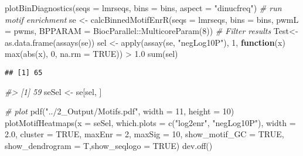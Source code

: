 \documentclass[
  10pt,
]{article}
\newenvironment{Shaded}{\begin{snugshade}}{\end{snugshade}}
\newcommand{\AttributeTok}[1]{\textcolor[rgb]{0.77,0.63,0.00}{#1}}
\newcommand{\CommentTok}[1]{\textcolor[rgb]{0.56,0.35,0.01}{\textit{#1}}}
\newcommand{\ConstantTok}[1]{\textcolor[rgb]{0.00,0.00,0.00}{#1}}
\newcommand{\ControlFlowTok}[1]{\textcolor[rgb]{0.13,0.29,0.53}{\textbf{#1}}}
\newcommand{\DecValTok}[1]{\textcolor[rgb]{0.00,0.00,0.81}{#1}}
\newcommand{\FloatTok}[1]{\textcolor[rgb]{0.00,0.00,0.81}{#1}}
\newcommand{\FunctionTok}[1]{\textcolor[rgb]{0.00,0.00,0.00}{#1}}
\newcommand{\NormalTok}[1]{#1}
\newcommand{\OtherTok}[1]{\textcolor[rgb]{0.56,0.35,0.01}{#1}}
\newcommand{\SpecialCharTok}[1]{\textcolor[rgb]{0.00,0.00,0.00}{#1}}
\newcommand{\StringTok}[1]{\textcolor[rgb]{0.31,0.60,0.02}{#1}}
\begin{document}
\begin{Shaded}
\begin{Highlighting}[]
\FunctionTok{plotBinDiagnostics}\NormalTok{(}\AttributeTok{seqs =}\NormalTok{ lmrseqs, }\AttributeTok{bins =}\NormalTok{ bins, }\AttributeTok{aspect =} \StringTok{"dinucfreq"}\NormalTok{)}
\CommentTok{\# run motif enrichment}
\NormalTok{se }\OtherTok{\textless{}{-}} \FunctionTok{calcBinnedMotifEnrR}\NormalTok{(}\AttributeTok{seqs =}\NormalTok{ lmrseqs, }\AttributeTok{bins =}\NormalTok{ bins, }\AttributeTok{pwmL =}\NormalTok{ pwms, }\AttributeTok{BPPARAM =}\NormalTok{ BiocParallel}\SpecialCharTok{::}\FunctionTok{MulticoreParam}\NormalTok{(}\DecValTok{8}\NormalTok{))}
\CommentTok{\# Filter results}
\NormalTok{Test}\OtherTok{\textless{}{-}}\FunctionTok{as.data.frame}\NormalTok{(}\FunctionTok{assays}\NormalTok{(se))}
\NormalTok{sel }\OtherTok{\textless{}{-}} \FunctionTok{apply}\NormalTok{(}\FunctionTok{assay}\NormalTok{(se, }\StringTok{"negLog10P"}\NormalTok{), }\DecValTok{1}\NormalTok{, }
             \ControlFlowTok{function}\NormalTok{(x) }\FunctionTok{max}\NormalTok{(}\FunctionTok{abs}\NormalTok{(x), }\DecValTok{0}\NormalTok{, }\AttributeTok{na.rm =} \ConstantTok{TRUE}\NormalTok{)) }\SpecialCharTok{\textgreater{}} \FloatTok{1.0}
\FunctionTok{sum}\NormalTok{(sel)}
\end{Highlighting}
\end{Shaded}

\begin{verbatim}
## [1] 65
\end{verbatim}

\begin{Shaded}
\begin{Highlighting}[]
\CommentTok{\#\textgreater{} [1] 59}
\NormalTok{seSel }\OtherTok{\textless{}{-}}\NormalTok{ se[sel, ]}

\CommentTok{\# plot}
\FunctionTok{pdf}\NormalTok{(}\StringTok{"../2\_Output/Motifs.pdf"}\NormalTok{, }\AttributeTok{width =} \DecValTok{11}\NormalTok{, }\AttributeTok{height =} \DecValTok{10}\NormalTok{)}
\FunctionTok{plotMotifHeatmaps}\NormalTok{(}\AttributeTok{x =}\NormalTok{ seSel, }\AttributeTok{which.plots =} \FunctionTok{c}\NormalTok{(}\StringTok{"log2enr"}\NormalTok{, }\StringTok{"negLog10P"}\NormalTok{), }
                  \AttributeTok{width =} \FloatTok{2.0}\NormalTok{, }\AttributeTok{cluster =} \ConstantTok{TRUE}\NormalTok{, }\AttributeTok{maxEnr =} \DecValTok{2}\NormalTok{, }\AttributeTok{maxSig =} \DecValTok{10}\NormalTok{, }
                  \AttributeTok{show\_motif\_GC =} \ConstantTok{TRUE}\NormalTok{, }\AttributeTok{show\_dendrogram =}\NormalTok{ T,}\AttributeTok{show\_seqlogo =} \ConstantTok{TRUE}\NormalTok{)}
\FunctionTok{dev.off}\NormalTok{()}
\end{Highlighting}
\end{Shaded}
\end{document}
